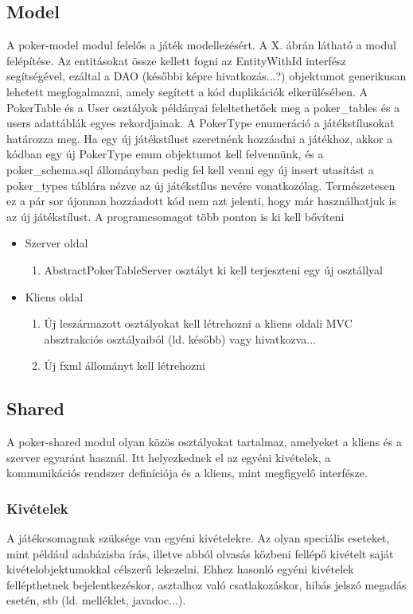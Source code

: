 \subsection{Model} \label{sec:poker-model}
A poker-model modul felelős a játék modellezésért. A X. ábrán látható a modul felépítése. Az entitásokat össze kellett fogni az EntityWithId interfész segítségével, ezáltal a DAO (későbbi képre hivatkozás...?) objektumot generikusan lehetett megfogalmazni, amely segített a kód duplikációk elkerülésében. A PokerTable és a User osztályok példányai feleltethetőek meg a poker\_tables és a users adattáblák egyes rekordjainak. A PokerType enumeráció a játékstílusokat határozza meg. Ha egy új játékstílust szeretnénk hozzáadni a játékhoz, akkor a kódban egy új PokerType enum objektumot kell felvennünk, és a poker\_schema.sql állományban pedig fel kell venni egy új insert utasítást a poker\_types táblára nézve az új játékstílus nevére vonatkozólag. Természetesen ez a pár sor újonnan hozzáadott kód nem azt jelenti, hogy már használhatjuk is az új játékstílust. A programcsomagot több ponton is ki kell bővíteni
\begin{itemize}[leftmargin=2cm]
	\item Szerver oldal
		\begin{enumerate}
			\item AbstractPokerTableServer osztályt ki kell terjeszteni egy új osztállyal
		\end{enumerate}
	\item Kliens oldal
		\begin{enumerate}
			\item Új leszármazott osztályokat kell létrehozni a kliens oldali MVC absztrakciós osztályaiból (ld. később) vagy hivatkozva...
			\item Új fxml állományt kell létrehozni
		\end{enumerate}
\end{itemize}

\subsection{Shared}
A poker-shared modul olyan közös osztályokat tartalmaz, amelyeket a kliens és a szerver egyaránt használ. Itt helyezkednek el az egyéni kivételek, a kommunikációs rendszer definíciója és a kliens, mint megfigyelő interfésze.

\subsubsection{Kivételek}
A játékcsomagnak szüksége van egyéni kivételekre. Az olyan speciális eseteket, mint például adabázisba írás, illetve abból olvasás közbeni fellépő kivételt saját kivételobjektumokkal célszerű lekezelni. Ehhez hasonló egyéni kivételek fellépthetnek bejelentkezéskor, asztalhoz való csatlakozáskor, hibás jelszó megadás esetén, stb (ld. melléklet, javadoc...).

